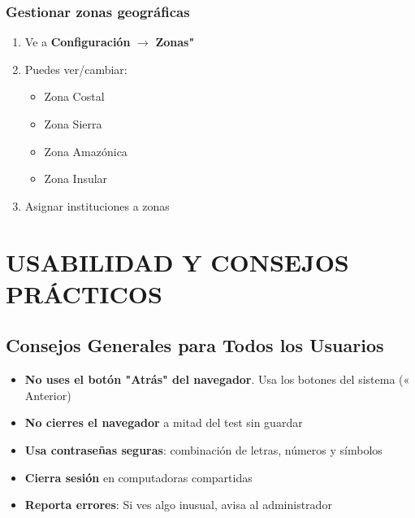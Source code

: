 \documentclass[12pt, a4paper]{report}
\begin{document}
\subsection{Gestionar zonas geográficas}
\begin{enumerate}
    \item Ve a \textbf{Configuración} $\rightarrow$ \textbf{Zonas"}
    \item Puedes ver/cambiar:
    \begin{itemize}
        \item Zona Costal
        \item Zona Sierra
        \item Zona Amazónica
        \item Zona Insular
    \end{itemize}
    \item Asignar instituciones a zonas
\end{enumerate}

\chapter{USABILIDAD Y CONSEJOS PRÁCTICOS}

\section{Consejos Generales para Todos los Usuarios}
\begin{tcolorbox}[colback=lightgray, colframe=successgreen, title=Mejores Prácticas]
\begin{itemize}
    \item \textbf{No uses el botón "Atrás" del navegador}. Usa los botones del sistema (« Anterior)
    \item \textbf{No cierres el navegador} a mitad del test sin guardar
    \item \textbf{Usa contraseñas seguras}: combinación de letras, números y símbolos
    \item \textbf{Cierra sesión} en computadoras compartidas
    \item \textbf{Reporta errores}: Si ves algo inusual, avisa al administrador
\end{itemize}
\end{tcolorbox}
\end{document}
